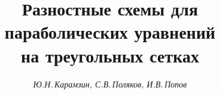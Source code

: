 




% 





\newcommand{\lEq}[1]{\label{eq:#1}}


\newcommand{\grad}{\operatorname{grad}}


\newcommand{\diver}{\operatorname{div}}


\newcommand{\vphi}{\varphi}


\newcommand{\veps}{\varepsilon}


\newcommand{\parti}[2]{\frac{\partial #1}{\partial #2}}


\renewcommand{\baselinestretch}{0.98}


\newcommand{\tts}[1]{}







\setcounter{page}{53}















\author{\it Ю.Н.\,Карамзин, С.В.\,Поляков, И.В.\,Попов}




\title{Разностные схемы для параболических уравнений\\


на треугольных сетках}





\date{}




\pagestyle{plain} %





